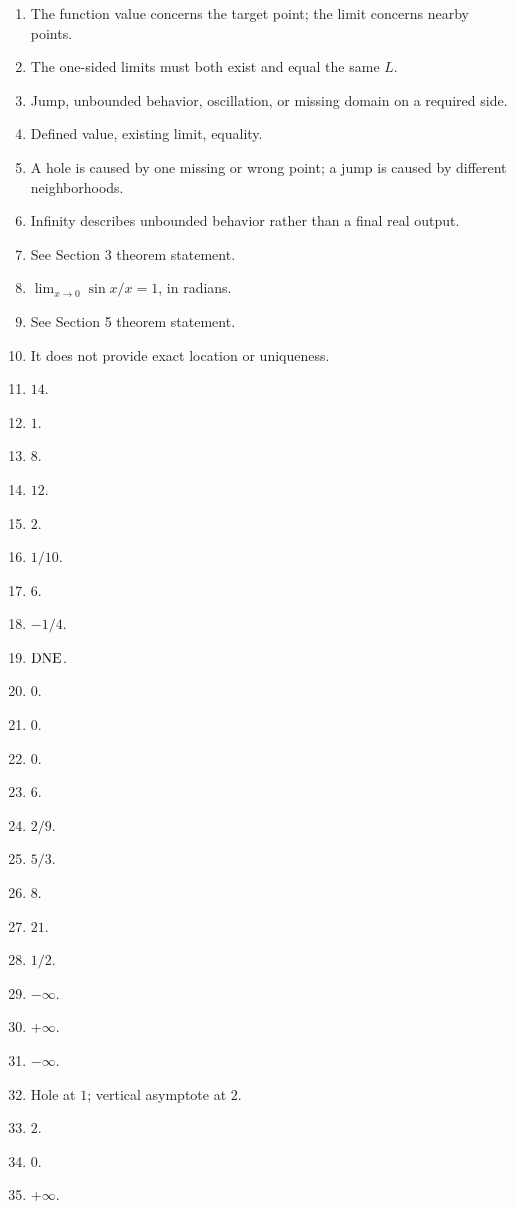 \begin{enumerate}[label=\textbf{R\arabic*.}]
  \item The function value concerns the target point; the limit concerns nearby points.
  \item The one-sided limits must both exist and equal the same \(L\).
  \item Jump, unbounded behavior, oscillation, or missing domain on a required side.
  \item Defined value, existing limit, equality.
  \item A hole is caused by one missing or wrong point; a jump is caused by different neighborhoods.
  \item Infinity describes unbounded behavior rather than a final real output.
  \item See Section 3 theorem statement.
  \item \(\lim_{x\to0}\sin x/x=1\), in radians.
  \item See Section 5 theorem statement.
  \item It does not provide exact location or uniqueness.
  \item \(14\).
  \item \(1\).
  \item \(8\).
  \item \(12\).
  \item \(2\).
  \item \(1/10\).
  \item \(6\).
  \item \(-1/4\).
  \item \(\mathrm{DNE}\).
  \item \(0\).
  \item \(0\).
  \item \(0\).
  \item \(6\).
  \item \(2/9\).
  \item \(5/3\).
  \item \(8\).
  \item \(21\).
  \item \(1/2\).
  \item \(-\infty\).
  \item \(+\infty\).
  \item \(-\infty\).
  \item Hole at \(1\); vertical asymptote at \(2\).
  \item \(2\).
  \item \(0\).
  \item \(+\infty\).

\end{enumerate}
